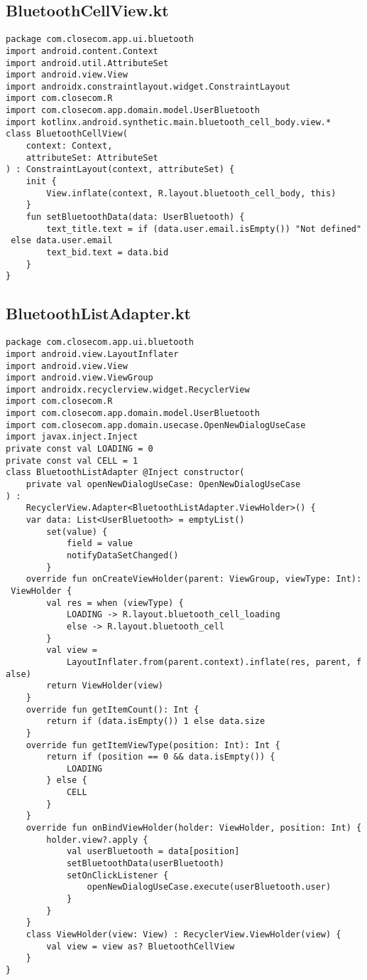 \documentclass[listing]{espd}
\begin{document}
\subsection{BluetoothCellView.kt}
\begin{verbatim}
package com.closecom.app.ui.bluetooth
import android.content.Context
import android.util.AttributeSet
import android.view.View
import androidx.constraintlayout.widget.ConstraintLayout
import com.closecom.R
import com.closecom.app.domain.model.UserBluetooth
import kotlinx.android.synthetic.main.bluetooth_cell_body.view.*
class BluetoothCellView(
    context: Context,
    attributeSet: AttributeSet
) : ConstraintLayout(context, attributeSet) {
    init {
        View.inflate(context, R.layout.bluetooth_cell_body, this)
    }
    fun setBluetoothData(data: UserBluetooth) {
        text_title.text = if (data.user.email.isEmpty()) "Not defined"
 else data.user.email
        text_bid.text = data.bid
    }
}
\end{verbatim}

\subsection{BluetoothListAdapter.kt}
\begin{verbatim}
package com.closecom.app.ui.bluetooth
import android.view.LayoutInflater
import android.view.View
import android.view.ViewGroup
import androidx.recyclerview.widget.RecyclerView
import com.closecom.R
import com.closecom.app.domain.model.UserBluetooth
import com.closecom.app.domain.usecase.OpenNewDialogUseCase
import javax.inject.Inject
private const val LOADING = 0
private const val CELL = 1
class BluetoothListAdapter @Inject constructor(
    private val openNewDialogUseCase: OpenNewDialogUseCase
) :
    RecyclerView.Adapter<BluetoothListAdapter.ViewHolder>() {
    var data: List<UserBluetooth> = emptyList()
        set(value) {
            field = value
            notifyDataSetChanged()
        }
    override fun onCreateViewHolder(parent: ViewGroup, viewType: Int):
 ViewHolder {
        val res = when (viewType) {
            LOADING -> R.layout.bluetooth_cell_loading
            else -> R.layout.bluetooth_cell
        }
        val view =
            LayoutInflater.from(parent.context).inflate(res, parent, f
alse)
        return ViewHolder(view)
    }
    override fun getItemCount(): Int {
        return if (data.isEmpty()) 1 else data.size
    }
    override fun getItemViewType(position: Int): Int {
        return if (position == 0 && data.isEmpty()) {
            LOADING
        } else {
            CELL
        }
    }
    override fun onBindViewHolder(holder: ViewHolder, position: Int) {
        holder.view?.apply {
            val userBluetooth = data[position]
            setBluetoothData(userBluetooth)
            setOnClickListener {
                openNewDialogUseCase.execute(userBluetooth.user)
            }
        }
    }
    class ViewHolder(view: View) : RecyclerView.ViewHolder(view) {
        val view = view as? BluetoothCellView
    }
}
\end{verbatim}
\end{document}
